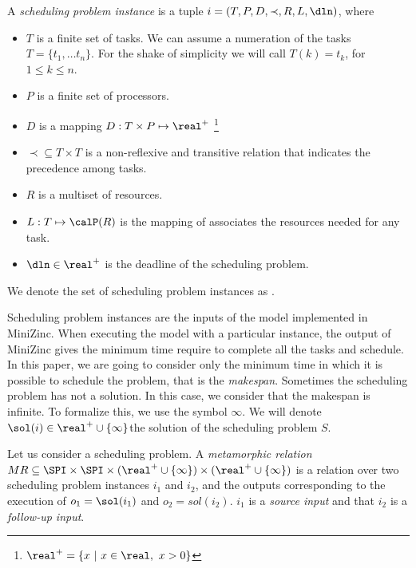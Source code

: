 \begin{definition}
  A \emph{scheduling problem instance} is a tuple $i=(T, P, D, \prec, R, L, \dln)$, where
  \begin{itemize}
  \item $T$ is a finite set of tasks. We can assume a numeration of
    the tasks $T=\{t_{1},\ldots t_{n}\}$. For the shake of simplicity
    we will call $T(k)=t_{k}$, for $1\leq k\leq n$.
  \item $P$ is a finite set of processors.
  \item $D$ is a mapping $D:T\times P\mapsto \real^{+}$
    \footnote{$\real^{+}=\{x\ |\ x\in\real,\ x>0\}$}
  \item $\prec\subseteq T\times T$ is a non-reflexive and transitive relation that
    indicates the precedence among tasks.
  \item $R$ is a multiset of resources.
  \item $L: T\mapsto\calP(R)$ is the mapping of associates the
    resources needed for any task.
  \item $\dln\in\real^{+}$ is the deadline of the scheduling problem.
  \end{itemize}
  We denote the set of scheduling problem instances as \SPI.
\end{definition}


Scheduling problem instances are the inputs of the model implemented
in MiniZinc. When executing the model with a particular instance, the
output of MiniZinc gives the minimum time require to complete all the
tasks and schedule.
In this paper, we are going to
consider only the minimum time in which it is possible to
schedule the problem, that is the \emph{makespan}. Sometimes the
scheduling problem has not a solution. In this case, we consider that
the makespan is infinite. To formalize this, we use
the symbol $\infty$. We will denote
$\sol(i)\in\real^{+}\cup\{\infty\}$\footnotemark the solution of the scheduling
problem $S$.


\begin{definition}
Let us consider a scheduling problem.
A \emph{metamorphic relation}  $MR\subseteq\SPI\times\SPI\times(\real^{+}\cup\{\infty\})\times(\real^{+}\cup\{\infty\})$
is a relation over two
scheduling problem instances $i_1$ and $i_2$, and the outputs
corresponding
to the execution of $o_{1}=\sol(i_1)$ and $o_{2}=sol(i_2)$.
$i_1$ is a \emph{source input} and that $i_2$ is a \emph{follow-up input}.




\end{definition}



